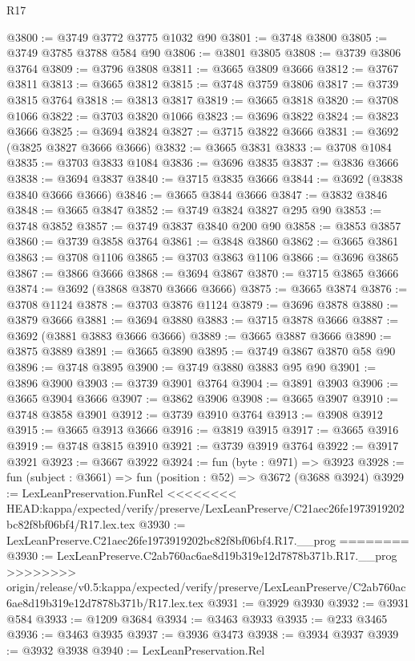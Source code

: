 \begin{lexlean}{R17}
\begin{coremodule}
{{{{{{{{{{{{{{{{{{{{{{{{{{{{{{{{{{{{{{{{{{{{{{{{{{{{{{{{{{{{{{{{{{{{{{{{{{{{{{{{{{{{{@3800 := @3749 @3772 @3775 @1032 @90
@3801 := @3748 @3800
@3805 := @3749 @3785 @3788 @584 @90
@3806 := @3801 @3805
@3808 := @3739 @3806 @3764
@3809 := @3796 @3808
@3811 := @3665 @3809 @3666
@3812 := @3767 @3811
@3813 := @3665 @3812
@3815 := @3748 @3759 @3806
@3817 := @3739 @3815 @3764
@3818 := @3813 @3817
@3819 := @3665 @3818
@3820 := @3708 @1066
@3822 := @3703 @3820 @1066
@3823 := @3696 @3822
@3824 := @3823 @3666
@3825 := @3694 @3824
@3827 := @3715 @3822 @3666
@3831 := @3692 (@3825 @3827 @3666 @3666)
@3832 := @3665 @3831
@3833 := @3708 @1084
@3835 := @3703 @3833 @1084
@3836 := @3696 @3835
@3837 := @3836 @3666
@3838 := @3694 @3837
@3840 := @3715 @3835 @3666
@3844 := @3692 (@3838 @3840 @3666 @3666)
@3846 := @3665 @3844 @3666
@3847 := @3832 @3846
@3848 := @3665 @3847
@3852 := @3749 @3824 @3827 @295 @90
@3853 := @3748 @3852
@3857 := @3749 @3837 @3840 @200 @90
@3858 := @3853 @3857
@3860 := @3739 @3858 @3764
@3861 := @3848 @3860
@3862 := @3665 @3861
@3863 := @3708 @1106
@3865 := @3703 @3863 @1106
@3866 := @3696 @3865
@3867 := @3866 @3666
@3868 := @3694 @3867
@3870 := @3715 @3865 @3666
@3874 := @3692 (@3868 @3870 @3666 @3666)
@3875 := @3665 @3874
@3876 := @3708 @1124
@3878 := @3703 @3876 @1124
@3879 := @3696 @3878
@3880 := @3879 @3666
@3881 := @3694 @3880
@3883 := @3715 @3878 @3666
@3887 := @3692 (@3881 @3883 @3666 @3666)
@3889 := @3665 @3887 @3666
@3890 := @3875 @3889
@3891 := @3665 @3890
@3895 := @3749 @3867 @3870 @58 @90
@3896 := @3748 @3895
@3900 := @3749 @3880 @3883 @95 @90
@3901 := @3896 @3900
@3903 := @3739 @3901 @3764
@3904 := @3891 @3903
@3906 := @3665 @3904 @3666
@3907 := @3862 @3906
@3908 := @3665 @3907
@3910 := @3748 @3858 @3901
@3912 := @3739 @3910 @3764
@3913 := @3908 @3912
@3915 := @3665 @3913 @3666
@3916 := @3819 @3915
@3917 := @3665 @3916
@3919 := @3748 @3815 @3910
@3921 := @3739 @3919 @3764
@3922 := @3917 @3921
@3923 := @3667 @3922
@3924 := fun (byte : @971) => @3923
@3928 := fun (subject : @3661) => fun (position : @52) => @3672 (@3688 @3924)
@3929 := LexLeanPreservation.FunRel
<<<<<<<< HEAD:kappa/expected/verify/preserve/LexLeanPreserve/C21aec26fe1973919202bc82f8bf06bf4/R17.lex.tex
@3930 := LexLeanPreserve.C21aec26fe1973919202bc82f8bf06bf4.R17.__prog
========
@3930 := LexLeanPreserve.C2ab760ac6ae8d19b319e12d7878b371b.R17.__prog
>>>>>>>> origin/release/v0.5:kappa/expected/verify/preserve/LexLeanPreserve/C2ab760ac6ae8d19b319e12d7878b371b/R17.lex.tex
@3931 := @3929 @3930
@3932 := @3931 @584
@3933 := @1209 @3684
@3934 := @3463 @3933
@3935 := @233 @3465
@3936 := @3463 @3935
@3937 := @3936 @3473
@3938 := @3934 @3937
@3939 := @3932 @3938
@3940 := LexLeanPreservation.Rel
}}}}}}}}}}}}}}}}}}}}}}}}}}}}}}}}}}}}}}}}}}}}}}}}}}}}}}}}}}}}}}}}}}}}}}}}}}}}}}}}}}}}}
\end{coremodule}
\end{lexlean}
